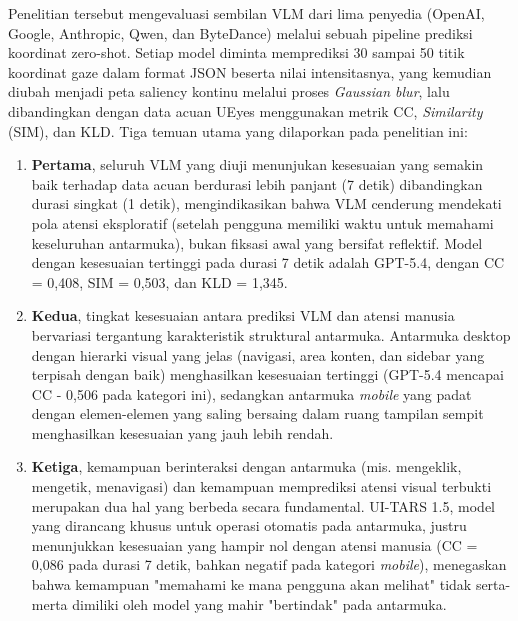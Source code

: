 Penelitian tersebut mengevaluasi sembilan VLM dari lima penyedia (OpenAI, Google, Anthropic, Qwen, dan ByteDance) melalui sebuah pipeline prediksi koordinat zero-shot. Setiap model diminta memprediksi 30 sampai 50 titik koordinat gaze dalam format JSON beserta nilai intensitasnya, yang kemudian diubah menjadi peta saliency kontinu melalui proses \textit{Gaussian blur}, lalu dibandingkan dengan data acuan UEyes menggunakan metrik CC, \textit{Similarity} (SIM), dan KLD. Tiga temuan utama yang dilaporkan pada penelitian ini:

\begin{enumerate}
    \item \textbf{Pertama}, seluruh VLM yang diuji menunjukan kesesuaian yang semakin baik terhadap data acuan berdurasi lebih panjant (7 detik) dibandingkan durasi singkat (1 detik), mengindikasikan bahwa VLM cenderung mendekati pola atensi eksploratif (setelah pengguna memiliki waktu untuk memahami keseluruhan antarmuka), bukan fiksasi awal yang bersifat reflektif. Model dengan kesesuaian tertinggi pada durasi 7 detik adalah GPT-5.4, dengan CC = 0,408, SIM = 0,503, dan KLD = 1,345.

    \item \textbf{Kedua}, tingkat kesesuaian antara prediksi VLM dan atensi manusia bervariasi tergantung karakteristik struktural antarmuka. Antarmuka desktop dengan hierarki visual yang jelas (navigasi, area konten, dan sidebar yang terpisah dengan baik) menghasilkan kesesuaian tertinggi (GPT-5.4 mencapai CC - 0,506 pada kategori ini), sedangkan antarmuka \textit{mobile} yang padat dengan elemen-elemen yang saling bersaing dalam ruang tampilan sempit menghasilkan kesesuaian yang jauh lebih rendah.

    \item \textbf{Ketiga}, kemampuan berinteraksi dengan antarmuka (mis. mengeklik, mengetik, menavigasi) dan kemampuan memprediksi atensi visual terbukti merupakan dua hal yang berbeda secara fundamental. UI-TARS 1.5, model yang dirancang khusus untuk operasi otomatis pada antarmuka, justru menunjukkan kesesuaian yang hampir nol dengan atensi manusia (CC = 0,086 pada durasi 7 detik, bahkan negatif pada kategori \textit{mobile}), menegaskan bahwa kemampuan "memahami ke mana pengguna akan melihat" tidak serta-merta dimiliki oleh model yang mahir "bertindak" pada antarmuka. 
\end{enumerate}

